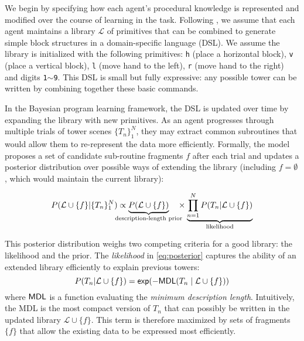\documentclass[10pt,letterpaper]{article}
\begin{document}
We begin by specifying how each agent's procedural knowledge is represented and modified over the course of learning in the task.
Following , we assume that each agent maintains a library $\mathcal{L}$ of primitives that can be combined to generate simple block structures in a domain-specific language (DSL).
We assume the library is initialized with the following primitives: \texttt{h} (place a horizontal block), \texttt{v} (place a vertical block), \texttt{l} (move hand to the left), \texttt{r} (move hand to the right) and digits \texttt{1}$\sim$\texttt{9}. 
This DSL is small but fully expressive: any possible tower can be written by combining together these basic commands.

In the Bayesian program learning framework, the DSL is updated over time by expanding the library with new primitives.
As an agent progresses through multiple trials of tower scenes $\{T_{n}\}_{1}^{N}$, they may extract common subroutines that would allow them to re-represent the data more efficiently.
Formally, the model proposes a set of candidate sub-routine fragments $f$ after each trial and updates a posterior distribution over possible ways of extending the library (including $f = \emptyset$, which would maintain the current library):

\begin{equation}
P(\mathcal{L} \cup \{f\}|\{T_{n}\}_{1}^{N}) \propto {\underbrace{P(\mathcal{L} \cup \{f\})}_{\mathclap{\text{description-length prior}}}} \quad \times {\underbrace{\prod_{n=1}^{N}P(T_{n}|\mathcal{L} \cup \{f\})}_{\mathclap{\text{likelihood}}}}
\label{eq:posterior}
\end{equation}

This posterior distribution weighs two competing criteria for a good library: the likelihood and the prior.
The \emph{likelihood} in \ref{eq:posterior} captures the ability of an extended library efficiently to explain previous towers:
\begin{equation*}
   P(T_n | \mathcal{L}\cup \{f\}) = \mathsf{exp}(- \mathsf{MDL}(T_{n}\mid \mathcal{L} \cup \{f\}))
\end{equation*}
where $\mathsf{MDL}$ is a function evaluating the \emph{minimum description length}.
Intuitively, the MDL is the most compact version of $T_{n}$
that can possibly be written in the updated library $\mathcal{L} \cup \{f\}$.
This term is therefore maximized by sets of fragments $\{f\}$ that allow the existing data to be expressed most efficiently. 
\end{document}

